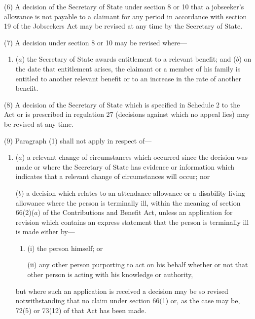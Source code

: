 \documentclass[12pt,a4paper]{article}
\begin{document}
(6) A decision of the Secretary of State under section 8 or 10 that a jobseeker’s allowance is not payable to a claimant for any period in accordance with section 19 of the Jobseekers Act may be revised at any time by the Secretary of State.

(7) A decision under section 8 or 10 may be revised where—
\begin{enumerate}\item[]
($a$) the Secretary of State awards entitlement to a relevant benefit; and
($b$) on the date that entitlement arises, the claimant or a member of his family is entitled to another relevant benefit or to an increase in the rate of another benefit.
\end{enumerate}

(8) A decision of the Secretary of State which is specified in Schedule 2 to the Act or is prescribed in regulation 27 (decisions against which no appeal lies) may be revised at any time.


(9) Paragraph (1) shall not apply in respect of—
\begin{enumerate}\item[]
($a$) a relevant change of circumstances which occurred since the decision was made or where the Secretary of State has evidence or information which indicates that a relevant change of circumstances will occur; nor

($b$) a decision which relates to an attendance allowance or a disability living allowance where the person is terminally ill, within the meaning of section 66(2)($a$) of the Contributions and Benefit Act, unless an application for revision which contains an express statement that the person is terminally ill is made either by—
\begin{enumerate}\item[]
(i) the person himself; or

(ii) any other person purporting to act on his behalf whether or not that other person is acting with his knowledge or authority,
\end{enumerate}
but where such an application is received a decision may be so revised notwithstanding that no claim under section 66(1) or, as the case may be, 72(5) or 73(12) of that Act has been made.
\end{enumerate}
\end{document}
